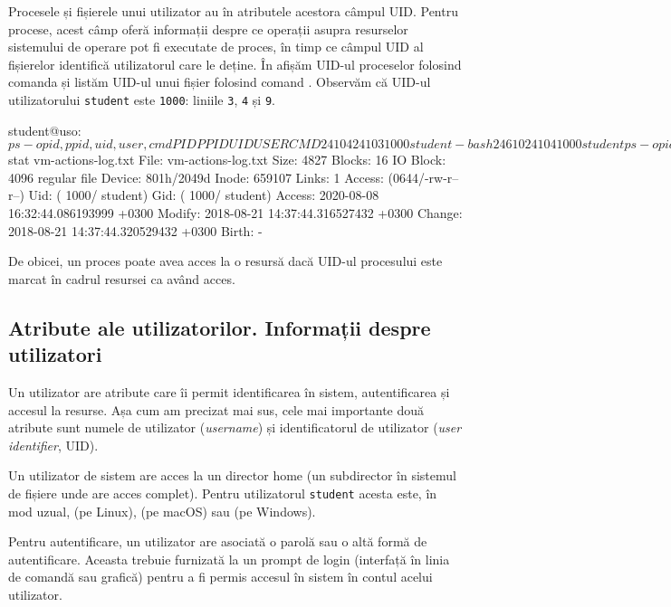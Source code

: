 Procesele și fișierele unui utilizator au în atributele acestora câmpul UID.
Pentru procese, acest câmp oferă informații despre ce operații asupra resurselor
sistemului de operare pot fi executate de proces, în timp ce câmpul UID al
fișierelor identifică utilizatorul care le deține. În  afișăm
UID-ul proceselor folosind comanda  și listăm UID-ul unui fișier folosind
comand . Observăm că UID-ul utilizatorului \texttt{student} este \texttt{1000}: liniile \texttt{3}, \texttt{4} și \texttt{9}.

\begin{screen}[caption={Afișare UID pentru procese și fișiere},label={lst:user:print-uid}]
student@uso:~$ ps -o pid,ppid,uid,user,cmd
  PID  PPID   UID USER     CMD
24104 24103  1000 student  -bash
24610 24104  1000 student  ps -o pid,ppid,uid,user,cmd
student@uso:~$ stat vm-actions-log.txt
  File: vm-actions-log.txt
  Size: 4827      	Blocks: 16         IO Block: 4096   regular file
Device: 801h/2049d	Inode: 659107      Links: 1
Access: (0644/-rw-r--r--)  Uid: ( 1000/ student)   Gid: ( 1000/ student)
Access: 2020-08-08 16:32:44.086193999 +0300
Modify: 2018-08-21 14:37:44.316527432 +0300
Change: 2018-08-21 14:37:44.320529432 +0300
 Birth: -
\end{screen}

De obicei, un proces poate avea acces la o resursă dacă UID-ul procesului este
marcat în cadrul resursei ca având acces.

\subsection{Atribute ale utilizatorilor. Informații despre utilizatori}
\label{sec:user:attributes}

Un utilizator are atribute care îi permit identificarea în sistem,
autentificarea și accesul la resurse. Așa cum am precizat mai sus, cele mai
importante două atribute sunt numele de utilizator (\textit{username}) și identificatorul
de utilizator (\textit{user identifier}, UID).

Un utilizator de sistem are acces la un director home (un subdirector în
sistemul de fișiere unde are acces complet). Pentru utilizatorul \texttt{student} acesta
este, în mod uzual,  (pe Linux),  (pe macOS) sau
 (pe Windows).

Pentru autentificare, un utilizator are asociată o parolă sau o altă formă de
autentificare. Aceasta trebuie furnizată la un prompt de login (interfață în
linia de comandă sau grafică) pentru a fi permis accesul în sistem în contul
acelui utilizator.

